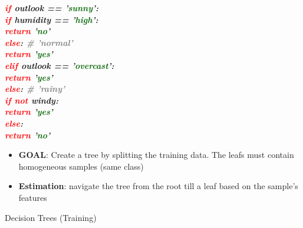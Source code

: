 \documentclass{KBook}
\begin{document}
		\begin{minipage}{0.25\textwidth} 
			\tiny\bfseries\itshape
			\textcolor{red}{if} outlook == '\textcolor{darkgreen}{sunny}':\\
			\hspace*{10pt}\textcolor{red}{if}  humidity == '\textcolor{darkgreen}{high}':\\
			\hspace*{20pt}\textcolor{red}{return}  '\textcolor{darkgreen}{no}'\\
			\hspace*{10pt}\textcolor{red}{else}: \textcolor{gray}{\# 'normal'}\\
			\hspace*{20pt}\textcolor{red}{return} '\textcolor{darkgreen}{yes}'\\
			\textcolor{red}{elif}  outlook == '\textcolor{darkgreen}{overcast}':\\
			\hspace*{10pt}\textcolor{red}{return} '\textcolor{darkgreen}{yes}'\\
			\textcolor{red}{else}: \textcolor{gray}{\# 'rainy'}\\
			\hspace*{10pt}\textcolor{red}{if not} windy:\\
			\hspace*{20pt}\textcolor{red}{return} '\textcolor{darkgreen}{yes}'\\
			\hspace*{10pt}\textcolor{red}{else}:\\
			\hspace*{20pt}\textcolor{red}{return} '\textcolor{darkgreen}{no}' 
		\end{minipage}
		\begin{minipage}{0.38\textwidth} 
		\end{minipage}
	
	\vspace{-6pt}
	\begin{itemize}
		\item \textbf{GOAL}: Create a tree by splitting the training data. The leafs must contain homogeneous samples (same class)
		\item \textbf{Estimation}: navigate the tree from the root till a leaf based on the sample's features
	\end{itemize}
	
	Decision Trees (Training)
	
\end{document}
